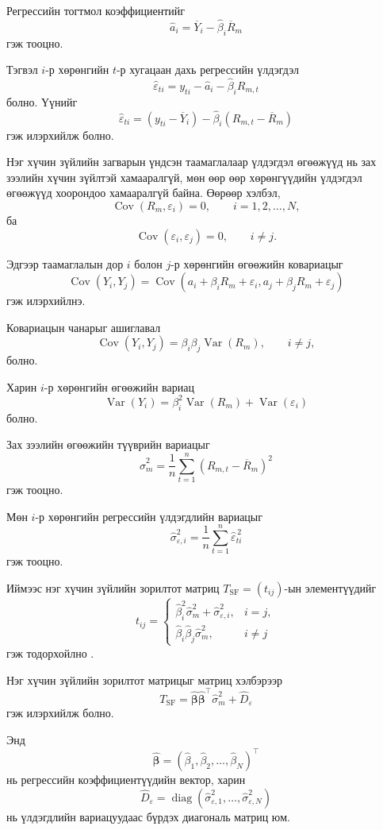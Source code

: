 Регрессийн тогтмол коэффициентийг
\[
\widehat{a}_i
=
\overline{Y}_i
-
\widehat{\beta}_i\overline{R}_m
\]
гэж тооцно.

Тэгвэл $i$-р хөрөнгийн $t$-р хугацаан дахь
регрессийн үлдэгдэл
\[
\widehat{\varepsilon}_{ti}
=
y_{ti}
-
\widehat{a}_i
-
\widehat{\beta}_iR_{m,t}
\]
болно. Үүнийг
\[
\widehat{\varepsilon}_{ti}
=
(y_{ti}-\overline{Y}_i)
-
\widehat{\beta}_i
(R_{m,t}-\overline{R}_m)
\]
гэж илэрхийлж болно.

Нэг хүчин зүйлийн загварын үндсэн таамаглалаар
үлдэгдэл өгөөжүүд нь зах зээлийн хүчин зүйлтэй
хамааралгүй, мөн өөр өөр хөрөнгүүдийн үлдэгдэл
өгөөжүүд хоорондоо хамааралгүй байна. Өөрөөр хэлбэл,
\[
\operatorname{Cov}(R_m,\varepsilon_i)=0,
\qquad i=1,2,\ldots,N,
\]
ба
\[
\operatorname{Cov}(\varepsilon_i,\varepsilon_j)=0,
\qquad i\neq j.
\]

Эдгээр таамаглалын дор $i$ болон $j$-р хөрөнгийн
өгөөжийн ковариацыг
\[
\operatorname{Cov}(Y_i,Y_j)
=
\operatorname{Cov}
(a_i+\beta_iR_m+\varepsilon_i,
a_j+\beta_jR_m+\varepsilon_j)
\]
гэж илэрхийлнэ.

Ковариацын чанарыг ашиглавал
\[
\operatorname{Cov}(Y_i,Y_j)
=
\beta_i\beta_j\operatorname{Var}(R_m),
\qquad i\neq j,
\]
болно.

Харин $i$-р хөрөнгийн өгөөжийн вариац
\[
\operatorname{Var}(Y_i)
=
\beta_i^2\operatorname{Var}(R_m)
+
\operatorname{Var}(\varepsilon_i)
\]
болно.

Зах зээлийн өгөөжийн түүврийн вариацыг
\[
\widehat{\sigma}_m^2
=
\frac{1}{n}
\sum_{t=1}^{n}
(R_{m,t}-\overline{R}_m)^2
\]
гэж тооцно.

Мөн $i$-р хөрөнгийн регрессийн үлдэгдлийн
вариацыг
\[
\widehat{\sigma}_{\varepsilon,i}^{2}
=
\frac{1}{n}
\sum_{t=1}^{n}
\widehat{\varepsilon}_{ti}^{\,2}
\]
гэж тооцно.

Иймээс нэг хүчин зүйлийн зорилтот матриц
$T_{\mathrm{SF}}=(t_{ij})$-ын элементүүдийг
\[
t_{ij}
=
\begin{cases}
	\widehat{\beta}_i^2\widehat{\sigma}_m^2
	+
	\widehat{\sigma}_{\varepsilon,i}^{2},
	& i=j,\\[0.4em]
	\widehat{\beta}_i\widehat{\beta}_j
	\widehat{\sigma}_m^2,
	& i\neq j
\end{cases}
\]
гэж тодорхойлно \citep{ledoitwolf2003}.

Нэг хүчин зүйлийн зорилтот матрицыг матриц
хэлбэрээр
\[
T_{\mathrm{SF}}
=
\widehat{\boldsymbol{\beta}}
\widehat{\boldsymbol{\beta}}^{\top}
\widehat{\sigma}_m^2
+
\widehat D_{\varepsilon}
\]
гэж илэрхийлж болно.

Энд
\[
\widehat{\boldsymbol{\beta}}
=
(\widehat{\beta}_1,
\widehat{\beta}_2,
\ldots,
\widehat{\beta}_N)^{\top}
\]
нь регрессийн коэффициентүүдийн вектор, харин
\[
\widehat D_{\varepsilon}
=
\operatorname{diag}
\left(
\widehat{\sigma}_{\varepsilon,1}^{2},
\ldots,
\widehat{\sigma}_{\varepsilon,N}^{2}
\right)
\]
нь үлдэгдлийн вариацуудаас бүрдэх диагональ
матриц юм.

